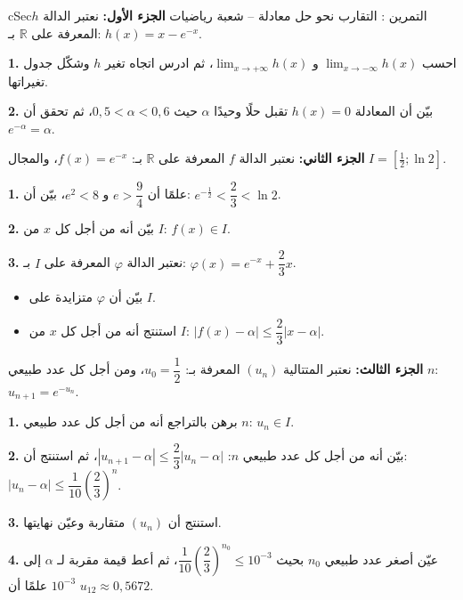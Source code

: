 \documentclass[12pt,a4paper]{article}
\newenvironment{BOX}[2]{\begin{otherlanguage}{english}\begin{arbox}{#1}{#2}}{\end{arbox}\end{otherlanguage}}
\newcounter{exo}
\newenvironment{tamrin}[1]{\stepcounter{exo}\begin{BOX}{cSec}{التمرين \theexo: #1}}{\end{BOX}}
\newcommand{\R}{\mathbb{R}}
\newenvironment{sq}{\begin{itemize}[leftmargin=2.4em,itemsep=3pt]}{\end{itemize}}
\newcommand{\qa}{\item[(أ)]}\newcommand{\qb}{\item[(ب)]}\newcommand{\qc}{\item[(جـ)]}\newcommand{\qd}{\item[(د)]}\newcommand{\qe}{\item[(هـ)]}
\newcommand{\QQ}[1]{\par\smallskip\textbf{#1.} }
\begin{document}
\begin{tamrin}{التقارب نحو حل معادلة -- شعبة رياضيات}
\textbf{الجزء الأول:} نعتبر الدالة $h$ المعرفة على $\R$ بـ: $h(x)=x-e^{-x}$.
\QQ{1} احسب $\displaystyle\lim_{x\to-\infty}h(x)$ و $\displaystyle\lim_{x\to+\infty}h(x)$، ثم ادرس اتجاه تغير $h$ وشكّل جدول تغيراتها.
\QQ{2} بيّن أن المعادلة $h(x)=0$ تقبل حلًا وحيدًا $\alpha$ حيث $0{,}5<\alpha<0{,}6$، ثم تحقق أن $e^{-\alpha}=\alpha$.

\textbf{الجزء الثاني:} نعتبر الدالة $f$ المعرفة على $\R$ بـ: $f(x)=e^{-x}$، والمجال $I=\left[\frac12;\ln2\right]$.
\QQ{1} علمًا أن $e>\dfrac94$ و $e^2<8$، بيّن أن: $e^{-\frac12}<\dfrac23<\ln2$.
\QQ{2} بيّن أنه من أجل كل $x$ من $I$: $f(x)\in I$.
\QQ{3} نعتبر الدالة $\varphi$ المعرفة على $I$ بـ: $\varphi(x)=e^{-x}+\dfrac23x$.
\begin{sq}
\qa بيّن أن $\varphi$ متزايدة على $I$.
\qb استنتج أنه من أجل كل $x$ من $I$: $\left|f(x)-\alpha\right|\leqslant\dfrac23\left|x-\alpha\right|$.
\end{sq}

\textbf{الجزء الثالث:} نعتبر المتتالية $(u_n)$ المعرفة بـ: $u_0=\dfrac12$، ومن أجل كل عدد طبيعي $n$: $u_{n+1}=e^{-u_n}$.
\QQ{1} برهن بالتراجع أنه من أجل كل عدد طبيعي $n$: $u_n\in I$.
\QQ{2} بيّن أنه من أجل كل عدد طبيعي $n$: $\left|u_{n+1}-\alpha\right|\leqslant\dfrac23\left|u_n-\alpha\right|$، ثم استنتج أن: $\left|u_n-\alpha\right|\leqslant\dfrac1{10}\left(\dfrac23\right)^n$.
\QQ{3} استنتج أن $(u_n)$ متقاربة وعيّن نهايتها.
\QQ{4} عيّن أصغر عدد طبيعي $n_0$ بحيث $\dfrac1{10}\left(\dfrac23\right)^{n_0}\leqslant10^{-3}$، ثم أعط قيمة مقربة لـ $\alpha$ إلى $10^{-3}$ علمًا أن $u_{12}\approx0{,}5672$.
\end{tamrin}
\end{document}
